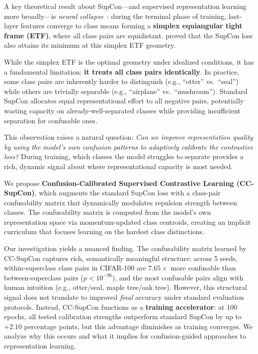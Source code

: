 \documentclass{article}
\begin{document}
A key theoretical result about SupCon---and supervised representation learning more broadly---is \emph{neural collapse}~\citep{papyan2020prevalence}: during the terminal phase of training, last-layer features converge to class means forming a \textbf{simplex equiangular tight frame (ETF)}, where all class pairs are equidistant. \citet{graf2021dissecting} proved that the SupCon loss also attains its minimum at this simplex ETF geometry.

While the simplex ETF is the optimal geometry under idealized conditions, it has a fundamental limitation: \textbf{it treats all class pairs identically}. In practice, some class pairs are inherently harder to distinguish (e.g., ``otter'' vs.\ ``seal'') while others are trivially separable (e.g., ``airplane'' vs.\ ``mushroom''). Standard SupCon allocates equal representational effort to all negative pairs, potentially wasting capacity on already-well-separated classes while providing insufficient separation for confusable ones.

This observation raises a natural question: \emph{Can we improve representation quality by using the model's own confusion patterns to adaptively calibrate the contrastive loss?} During training, which classes the model struggles to separate provides a rich, dynamic signal about where representational capacity is most needed.

We propose \textbf{Confusion-Calibrated Supervised Contrastive Learning (CC-SupCon)}, which augments the standard SupCon loss with a class-pair confusability matrix that dynamically modulates repulsion strength between classes. The confusability matrix is computed from the model's own representation space via momentum-updated class centroids, creating an implicit curriculum that focuses learning on the hardest class distinctions.

Our investigation yields a nuanced finding. The confusability matrix learned by CC-SupCon captures rich, semantically meaningful structure: across 5 seeds, within-superclass class pairs in CIFAR-100 are $7.65\times$ more confusable than between-superclass pairs ($p < 10^{-96}$), and the most confusable pairs align with human intuition (e.g., otter/seal, maple tree/oak tree). However, this structural signal does not translate to improved \emph{final} accuracy under standard evaluation protocols. Instead, CC-SupCon functions as a \textbf{training accelerator}: at 100 epochs, all tested calibration strengths outperform standard SupCon by up to $+2.10$ percentage points, but this advantage diminishes as training converges. We analyze why this occurs and what it implies for confusion-guided approaches to representation learning.
\end{document}
